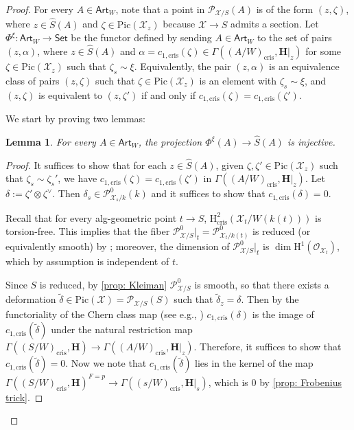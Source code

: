 \documentclass[letter, 11pt]{article}
\theoremstyle{plain}
\newtheorem{lemma}[subsubsection]{Lemma}
\theoremstyle{definition}
\newcommand\tensor{{\otimes}}
\newcommand{\<}{\langle}
\renewcommand{\>}{\rangle}
\def\wt{\widetilde}
\newcommand{\sX}{\mathcal{X}}
\newcommand{\sO}{\mathcal{O}}
\newcommand{\Pic}{\mathrm{Pic}}
\renewcommand{\H}{\mathrm{H}}
\newcommand{\shP}{\mathscr{P}}
\newcommand{\cris}{\mathrm{cris}}
\newcommand{\bH}{\mathbf{H}}
\begin{document}
\begin{proof}
    For every $A \in \mathsf{Art}_W$, note that a point in $\shP_{\sX/S}(A)$ is of the form $(z, \zeta)$, where $z \in \hat{S}(A)$ and $\zeta \in \Pic(\sX_z)$ because $\sX \to S$ admits a section. Let $\Phi^\xi : \mathsf{Art}_W \to \mathsf{Set}$ be the functor defined by sending $A \in \mathsf{Art}_W$ to the set of pairs $(z, \alpha)$, where $z \in \hat{S}(A)$ and $\alpha = c_{1, \cris}(\zeta) \in \Gamma((A/W)_\cris, \bH|_z)$ for some $\zeta \in \Pic(\sX_z)$ such that $\zeta_s \sim \xi$. Equivalently, the pair $(z, \alpha)$ is an equivalence class of pairs $(z, \zeta)$ such that $\zeta \in \Pic(\sX_z)$ is an element with $\zeta_s \sim \xi$, and $(z, \zeta)$ is equivalent to $(z, \zeta')$ if and only if $c_{1, \cris}(\zeta) = c_{1, \cris}(\zeta')$. 
    
    We start by proving two lemmas: 

    \begin{lemma}
\label{lem: injectivity}
    For every $A \in \mathsf{Art}_W$, the projection $\Phi^\xi(A) \to \hat{S}(A)$ is injective. 
\end{lemma}
\begin{proof}
    It suffices to show that for each $z \in \hat{S}(A)$, given $\zeta, \zeta' \in \Pic(\sX_z)$ such that $\zeta_s \sim \zeta_s'$, we have $c_{1, \cris}(\zeta) = c_{1, \cris}(\zeta')$ in $\Gamma((A/W)_\cris, \bH|_{z})$. Let $\delta := \zeta' \tensor \zeta^\vee$. Then $\delta_s \in \shP^0_{\sX_s/k}(k)$ and it suffices to show that $c_{1, \cris}(\delta) = 0$. 
    
    Recall that for every alg-geometric point $t \to S$, $\H^2_\cris(\sX_t/ W(k(t)))$ is torsion-free. This implies that the fiber $\shP^0_{\sX/S}|_t = \shP^0_{\sX_t/k(t)}$ is reduced (or equivalently smooth) by \cite[II~Prop.~5.16]{Illusie}; moreover, the dimension of $\shP^0_{\sX/S}|_t$ is $\dim \H^1(\sO_{\sX_t})$, which by assumption is independent of $t$. 
    
    Since $S$ is reduced, by \ref{prop: Kleiman} $\shP^0_{\sX/S}$ is smooth, so that there exists a deformation $\wt{\delta} \in \Pic(\sX) = \shP_{\sX/S}(S)$ such that $\wt{\delta}_z = \delta$. Then by the functoriality of the Chern class map (see e.g., \cite[Thm~2.4(i)]{Berthelot-Illusie}) $c_{1, \cris}(\delta)$ is the image of $c_{1, \cris}(\wt{\delta})$ under the natural restriction map $\Gamma((S/W)_\cris, \bH) \to \Gamma((A/W)_\cris, \bH|_z)$. Therefore, it suffices to show that $c_{1, \cris}(\wt{\delta}) = 0$. Now we note that $c_{1, \cris}(\wt{\delta})$ lies in the kernel of the map $\Gamma((S/W)_\cris, \bH)^{F = p} \to \Gamma((s/W)_\cris, \bH|_s)$, which is $0$ by \ref{prop: Frobenius trick}. 
\end{proof}


\end{proof}
\end{document}
